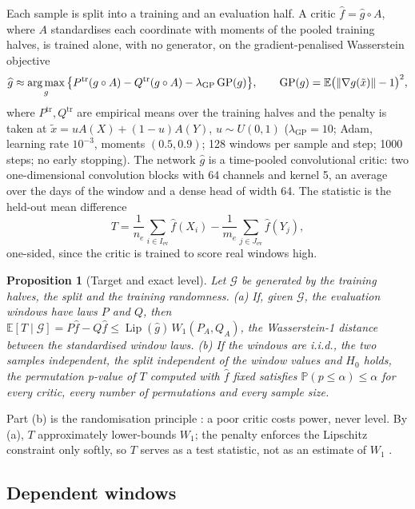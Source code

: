 \documentclass[11pt,a4paper]{article}
\theoremstyle{plain}
\newtheorem{proposition}{Proposition}
\newcommand{\E}{\mathbb{E}}
\newcommand{\Prob}{\mathbb{P}}
\newcommand{\W}{W_{1}}
\DeclareMathOperator{\Lip}{Lip}
\DeclareMathOperator*{\argmax}{arg\,max}
\DeclarePairedDelimiter{\norm}{\lVert}{\rVert}
\newcommand{\Gsig}{\mathcal{G}}
\newcommand{\trn}{\mathrm{tr}}
\newcommand{\evl}{\mathrm{ev}}
\newcommand{\fhat}{\widehat{f}}
\newcommand{\ghat}{\widehat{g}}
\newcommand{\lgp}{\lambda_{\mathrm{GP}}}
\begin{document}
Each sample is split into a training and an evaluation half. A critic $\fhat=\ghat\circ A$, where
$A$ standardises each coordinate with moments of the pooled training halves, is trained alone,
with no generator, on the gradient-penalised Wasserstein objective
\citep{gulrajani2017improved}
\begin{equation}\label{eq:wgan}
  \ghat\approx\argmax_g\big\{P^{\trn}(g\circ A)-Q^{\trn}(g\circ A)-\lgp\,\mathrm{GP}(g)\big\},\qquad
  \mathrm{GP}(g)=\E\big(\norm{\nabla g(\tilde x)}-1\big)^2,
\end{equation}
where $P^{\trn},Q^{\trn}$ are empirical means over the training halves and the penalty is taken at
$\tilde x=uA(X)+(1-u)A(Y)$, $u\sim U(0,1)$ ($\lgp=10$; Adam, learning rate $10^{-3}$, moments
$(0.5,0.9)$; 128 windows per sample and step; 1000 steps; no early stopping). The network $\ghat$ is a time-pooled convolutional critic: two
one-dimensional convolution blocks with 64 channels and kernel 5, an average over the days of the
window and a dense head of width 64. The statistic is the held-out mean difference
\begin{equation}\label{eq:T}
  T=\frac{1}{n_e}\sum_{i\in I_{\evl}}\fhat(X_i)-\frac{1}{m_e}\sum_{j\in J_{\evl}}\fhat(Y_j),
\end{equation}
one-sided, since the critic is trained to score real windows high.

\begin{proposition}[Target and exact level]\label{prop:exact}
Let $\Gsig$ be generated by the training halves, the split and the training randomness.
(a) If, given $\Gsig$, the evaluation windows have laws $P$ and $Q$, then
$\E[T\mid\Gsig]=P\fhat-Q\fhat\le\Lip(\ghat)\,\W(P_A,Q_A)$, the Wasserstein-1 distance between the
standardised window laws. (b) If the windows are i.i.d., the two samples independent, the split
independent of the window values and $H_0$ holds, the permutation p-value of $T$ computed with
$\fhat$ fixed satisfies $\Prob(p\le\alpha)\le\alpha$ for every critic, every number of permutations
and every sample size.
\end{proposition}

Part (b) is the randomisation principle \citep{hemerik2018exact}: a poor critic costs power, never
level. By (a), $T$ approximately lower-bounds $\W$; the penalty enforces the Lipschitz constraint
only softly, so $T$ serves as a test statistic, not as an estimate of $\W$
\citep{mallasto2019well}.

\subsection{Dependent windows}\label{sec:method-dep}
\end{document}
